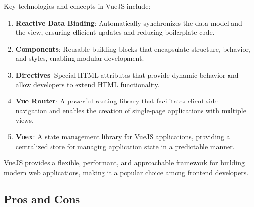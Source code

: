 Key technologies and concepts in VueJS include:
\begin{enumerate}
    \item \textbf{Reactive Data Binding}: Automatically synchronizes the data model and the view, ensuring efficient updates and reducing boilerplate code.
    \item \textbf{Components}: Reusable building blocks that encapsulate structure, behavior, and styles, enabling modular development.
    \item \textbf{Directives}: Special HTML attributes that provide dynamic behavior and allow developers to extend HTML functionality.
    \item \textbf{Vue Router}: A powerful routing library that facilitates client-side navigation and enables the creation of single-page applications with multiple views.
    \item \textbf{Vuex}: A state management library for VueJS applications, providing a centralized store for managing application state in a predictable manner.
\end{enumerate}

VueJS provides a flexible, performant, and approachable framework for building modern web applications, making it a popular choice among frontend developers.

\subsection{Pros and Cons}

\clearpage

